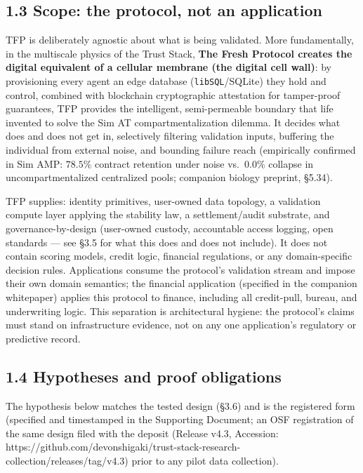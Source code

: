 \documentclass[
]{article}
\begin{document}
\subsection{1.3 Scope: the protocol, not an
application}\label{scope-the-protocol-not-an-application}

TFP is deliberately agnostic about what is being validated. More
fundamentally, in the multiscale physics of the Trust Stack, \textbf{The
Fresh Protocol creates the digital equivalent of a cellular membrane
(the digital cell wall)}: by provisioning every agent an edge database
(\texttt{libSQL}/SQLite) they hold and control, combined with blockchain
cryptographic attestation for tamper-proof guarantees, TFP provides the
intelligent, semi-permeable boundary that life invented to solve the Sim
AT compartmentalization dilemma. It decides what does and does not get
in, selectively filtering validation inputs, buffering the individual
from external noise, and bounding failure reach (empirically confirmed
in Sim AMP: \(78.5\%\) contract retention under noise vs.~\(0.0\%\)
collapse in uncompartmentalized centralized pools; companion biology
preprint, §5.34).

TFP supplies: identity primitives, user-owned data topology, a
validation compute layer applying the stability law, a settlement/audit
substrate, and governance-by-design (user-owned custody, accountable
access logging, open standards --- see §3.5 for what this does and does
not include). It does not contain scoring models, credit logic,
financial regulations, or any domain-specific decision rules.
Applications consume the protocol's validation stream and impose their
own domain semantics; the financial application (specified in the
companion whitepaper) applies this protocol to finance, including all
credit-pull, bureau, and underwriting logic. This separation is
architectural hygiene: the protocol's claims must stand on
infrastructure evidence, not on any one application's regulatory or
predictive record.

\subsection{1.4 Hypotheses and proof
obligations}\label{hypotheses-and-proof-obligations}

The hypothesis below matches the tested design (§3.6) and is the
registered form (specified and timestamped in the Supporting Document;
an OSF registration of the same design filed with the deposit (Release
v4.3, Accession:
https://github.com/devonshigaki/trust-stack-research-collection/releases/tag/v4.3)
prior to any pilot data collection).
\end{document}
